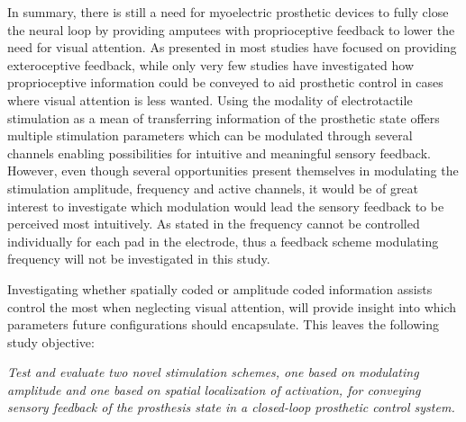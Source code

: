 

In summary, there is still a need for myoelectric prosthetic devices to fully close the neural loop by providing amputees with proprioceptive feedback to lower the need for visual attention. As presented in  most studies have focused on providing exteroceptive feedback, while only very few studies have investigated how proprioceptive information could be conveyed to aid prosthetic control in cases where visual attention is less wanted. Using the modality of electrotactile stimulation as a mean of transferring information of the prosthetic state offers multiple stimulation parameters which can be modulated through several channels enabling possibilities for intuitive and meaningful sensory feedback. However, even though several opportunities present themselves in modulating the stimulation amplitude, frequency and active channels, it would be of great interest to investigate which modulation would lead the sensory feedback to be perceived most intuitively. As stated in  the frequency cannot be controlled individually for each pad in the electrode, thus a feedback scheme modulating frequency will not be investigated in this study. 

Investigating whether spatially coded or amplitude coded information assists control the most when neglecting visual attention, will provide insight into which parameters future configurations should encapsulate. This leaves the following study objective: 

\begin{center}
	\textit{Test and evaluate two novel stimulation schemes, one based on modulating amplitude and one based on spatial localization of activation, for conveying sensory feedback of the prosthesis state in a closed-loop prosthetic control system.}  
\end{center} 